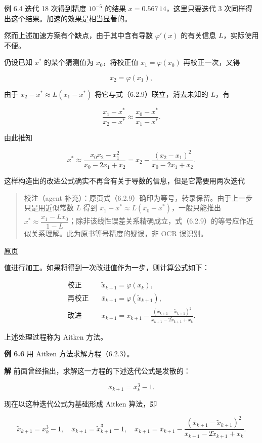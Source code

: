 \documentclass[
  10pt,
  fontset=fandol]{ctexart}
\begin{document}
例 6.4 迭代 18 次得到精度 \(10^{-5}\) 的结果 \(x=0.567\,14\)，这里只要迭代 3 次同样得出这个结果。加速的效果是相当显著的。

然而上述加速方案有个缺点，由于其中含有导数 \(\varphi'(x)\) 的有关信息 \(L\)，实际使用不便。

仍设已知 \(x^*\) 的某个猜测值为 \(x_0\)，将校正值 \(x_1=\varphi(x_0)\) 再校正一次，又得

\[
x_2=\varphi(x_1),
\]

由于 \(x_2-x^*\approx L(x_1-x^*)\) 将它与式（6.2.9）联立，消去未知的 \(L\)，有

\[
\frac{x_1-x^*}{x_2-x^*}\approx\frac{x_0-x^*}{x_1-x^*}.
\]

由此推知

\[
x^*\approx\frac{x_0x_2-x_1^2}{x_0-2x_1+x_2}=x_2-\frac{(x_2-x_1)^2}{x_0-2x_1+x_2}.
\]

这样构造出的改进公式确实不再含有关于导数的信息，但是它需要用两次迭代

\begin{quote}
校注（agent 补充）：原页式（6.2.9）确印为等号，转录保留。由于上一步只是用近似常数 \(L\) 得到 \(x_1-x^*\approx L(x_0-x^*)\)，一般只能推出 \(x^*\approx\dfrac{x_1-Lx_0}{1-L}\)；除非该线性误差关系精确成立，式（6.2.9）的等号应作近似关系理解。此为原书等号精度的疑误，非 OCR 误识别。
\end{quote}

\href{../../source-images/pdf-162.jpeg}{原页}

值进行加工。如果将得到一次改进值作为一步，则计算公式如下：

\[
\begin{aligned}
\text{校正}\quad&\tilde{x}_{k+1}=\varphi(x_k),\\
\text{再校正}\quad&\bar{x}_{k+1}=\varphi(\tilde{x}_{k+1}),\\
\text{改进}\quad&x_{k+1}=\bar{x}_{k+1}-\frac{(\bar{x}_{k+1}-\tilde{x}_{k+1})^2}{\bar{x}_{k+1}-2\tilde{x}_{k+1}+x_k}.
\end{aligned}
\tag{6.2.11}
\]

上述处理过程称为 Aitken 方法。

\textbf{例 6.6} 用 Aitken 方法求解方程（6.2.3）。

\textbf{解} 前面曾经指出，求解这一方程的下述迭代公式是发散的：

\[
x_{k+1}=x_k^3-1.
\tag{6.2.12}
\]

现在以这种迭代公式为基础形成 Aitken 算法，即

\[
\tilde{x}_{k+1}=x_k^3-1,\quad
\bar{x}_{k+1}=\tilde{x}_{k+1}^3-1,\quad
x_{k+1}=\bar{x}_{k+1}-\frac{(\bar{x}_{k+1}-\tilde{x}_{k+1})^2}{\bar{x}_{k+1}-2\tilde{x}_{k+1}+x_k}.
\]
\end{document}
